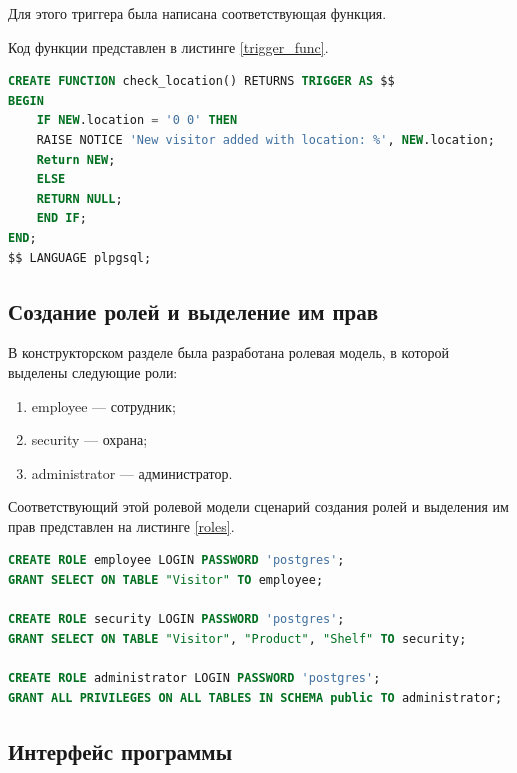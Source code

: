 Для этого триггера была написана соответствующая функция.


Код функции представлен в листинге \ref{trigger_func}.

\captionsetup{singlelinecheck = false, justification=raggedright}
\begin{lstlisting}[language=sql, caption=Реализация функции, label=trigger_func]
CREATE FUNCTION check_location() RETURNS TRIGGER AS $$
BEGIN
    IF NEW.location = '0 0' THEN
    RAISE NOTICE 'New visitor added with location: %', NEW.location;
    Return NEW;
    ELSE
    RETURN NULL;
    END IF;
END;
$$ LANGUAGE plpgsql;
\end{lstlisting}
\captionsetup{singlelinecheck = false, justification=centering}

\subsection{Создание ролей и выделение им прав}

В конструкторском разделе была разработана ролевая модель, в которой выделены
следующие роли:
\begin{enumerate}[label=\arabic*.]
    \item employee --- сотрудник;
    \item security --- охрана;
    \item administrator --- администратор.
\end{enumerate}

Соответствующий этой ролевой модели сценарий создания ролей и выделения им прав
представлен на листинге \ref{roles}.

\begin{lstlisting}[language=sql, caption=Создание ролей и выделение им прав, label=roles]
CREATE ROLE employee LOGIN PASSWORD 'postgres';
GRANT SELECT ON TABLE "Visitor" TO employee;

CREATE ROLE security LOGIN PASSWORD 'postgres';
GRANT SELECT ON TABLE "Visitor", "Product", "Shelf" TO security;

CREATE ROLE administrator LOGIN PASSWORD 'postgres';
GRANT ALL PRIVILEGES ON ALL TABLES IN SCHEMA public TO administrator;

\end{lstlisting}
\captionsetup{singlelinecheck = false, justification=centering}

\subsection{Интерфейс программы}

